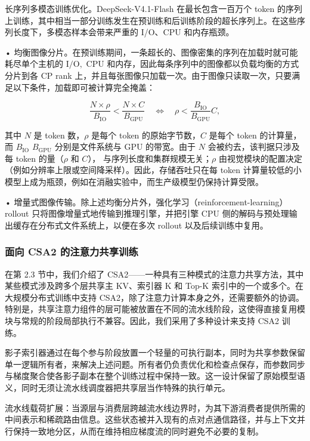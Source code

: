 \documentclass[
  10
]{article}
\begin{document}
长序列多模态训练优化。DeepSeek-V4.1-Flash 在最长包含一百万个 token 的序列上训练，其中相当一部分训练发生在预训练和后训练阶段的超长序列上。在这些序列长度下，多模态样本会带来严重的 I/O、CPU 和内存瓶颈。

• 均衡图像分片。在预训练期间，一条超长的、图像密集的序列在加载时就可能耗尽单个主机的
\(\mathrm { I } / \mathrm { O } ,\) CPU 和内存，因此每条序列中的图像都以负载均衡的方式分片到各 CP rank 上，并且每张图像只加载一次。由于图像只读取一次，只要满足以下条件，加载即可被计算完全掩盖：

\[
\frac { N \times \rho } { B _ { \mathrm { I O } } } < \frac { N \times C } { B _ { \mathrm { G P U } } } \quad \Longleftrightarrow \quad \rho < \frac { B _ { \mathrm { I O } } } { B _ { \mathrm { G P U } } } C ,
\]

其中 $N$ 是 token 数，$\rho$ 是每个 token 的原始字节数，$C$ 是每个 token 的计算量，而 \(B _ { \mathrm { I O } }\)
\(B _ { \mathrm { G P U } }\) 分别是文件系统与 GPU 的带宽。由于 $N$ 会被约去，该判据只涉及每 token 的量（$\rho$ 和 $C$），
与序列长度和集群规模无关；$\rho$ 由视觉模块的配置决定（例如分辨率上限或空间降采样）。因此，存储吞吐只在每 token 计算量较低的小模型上成为瓶颈，例如在消融实验中，而生产级模型仍保持计算受限。

• 增量式图像传输。除上述均衡分片外，强化学习（reinforcement-learning）rollout 只将图像增量式地传输到推理引擎，并把引擎 CPU 侧的解码与预处理输出缓存在分布式文件系统上，以便在多次 rollout 以及后续训练中复用。

\subsubsection{面向 CSA2 的注意力共享训练}\label{attention-sharing-trainingfor-csa2}

在第 2.3 节中，我们介绍了 CSA2——一种具有三种模式的注意力共享方法，其中某些模式涉及跨多个层共享主 KV、索引器 K 和 Top-K 索引中的一个或多个。在大规模分布式训练中支持 CSA2，除了注意力计算本身之外，还需要额外的协调。特别是，共享注意力组件的层可能被放置在不同的流水线阶段，这使得直接复用模块与常规的阶段局部执行不兼容。因此，我们采用了多种设计来支持 CSA2 训练。

影子索引器通过在每个参与阶段放置一个轻量的可执行副本，同时为共享参数保留单一逻辑所有者，来解决上述问题。所有者仍负责优化和检查点保存，而参数同步与梯度聚合使各影子副本在整个训练过程中保持一致。这一设计保留了原始模型语义，同时无须让流水线调度器把共享层当作特殊的执行单元。



流水线载荷扩展：当源层与消费层跨越流水线边界时，为其下游消费者提供所需的中间表示和稀疏路由信息。这些状态被并入现有的点对点通信路径，并与上下文并行保持一致地分区，从而在维持相应梯度流的同时避免不必要的复制。
\end{document}
